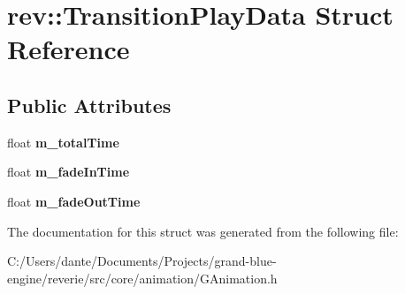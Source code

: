 \hypertarget{structrev_1_1_transition_play_data}{}\section{rev\+::Transition\+Play\+Data Struct Reference}
\label{structrev_1_1_transition_play_data}
\subsection*{Public Attributes}
\begin{DoxyCompactItemize}
\item 
\mbox{\label{structrev_1_1_transition_play_data_a7d3a83a26b9b1031680b22780f0d1438}} 
float {\bfseries m\+\_\+total\+Time}
\item 
\mbox{\label{structrev_1_1_transition_play_data_a415a63d5044e9d49fbafbe75193260bd}} 
float {\bfseries m\+\_\+fade\+In\+Time}
\item 
\mbox{\label{structrev_1_1_transition_play_data_a1aab55df90bf5faade269f3d58377720}} 
float {\bfseries m\+\_\+fade\+Out\+Time}
\end{DoxyCompactItemize}


The documentation for this struct was generated from the following file\+:\begin{DoxyCompactItemize}
\item 
C\+:/\+Users/dante/\+Documents/\+Projects/grand-\/blue-\/engine/reverie/src/core/animation/G\+Animation.\+h\end{DoxyCompactItemize}
